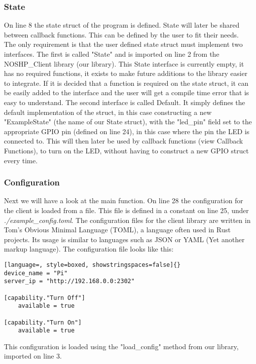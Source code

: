 \subsubsection{State}
On line 8 the state struct of the program is defined. State will later be shared between callback functions. This can be defined by the user to fit their needs. The only requirement is that the user defined state struct must implement two interfaces. The first is called "State" and is imported on line 2 from the NOSHP\_Client library (our library). This State interface is currently empty, it has no required functions, it exists to make future additions to the library easier to integrate. If it is decided that a function is required on the state struct, it can be easily added to the interface and the user will get a compile time error that is easy to understand. The second interface is called Default. It simply defines the default implementation of the struct, in this case constructing a new "ExampleState" (the name of our State struct), with the "led\_pin" field set to the appropriate GPIO pin (defined on line 24), in this case where the pin the LED is connected to. This will then later be used by callback functions (view Callback Functions), to turn on the LED, without having to construct a new GPIO struct every time.

\subsubsection{Configuration}
Next we will have a look at the main function. On line 28 the configuration for the client is loaded from a file. This file is defined in a constant on line 25, under \textit{./example\_config.toml}. The configuration files for the client library are written in Tom's Obvious Minimal Language (TOML), a language often used in Rust projects. Its usage is similar to languages such as JSON or YAML (Yet another markup language). The configuration file looks like this:

\begin{lstlisting}[language=, style=boxed, showstringspaces=false]{}
device_name = "Pi"
server_ip = "http://192.168.0.0:2302"

[capability."Turn Off"]
    available = true

[capability."Turn On"]
    available = true
\end{lstlisting}
This configuration is loaded using the "load\_config" method from our library, imported on line 3. 

